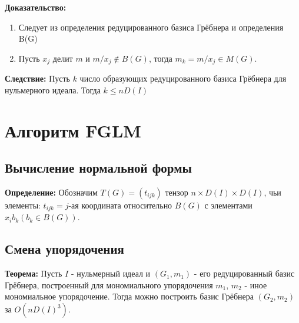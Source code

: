 \documentclass{article}
\begin{document}
    \textbf{Доказательство:}
    \begin{enumerate}
        \item Следует из определения редуцированного базиса Грёбнера и определения B(G)
        \item Пусть $x_j$ делит $m$ и $m/x_j \notin B(G)$, тогда $m_k = m/x_j \in M(G)$. 
    \end{enumerate}

    \textbf{Следствие:} Пусть $k$ число образующих редуцированного базиса Грёбнера для нульмерного идеала.
        Тогда $k \leq nD(I)$
    
    \newpage    

\section{Алгоритм FGLM}

    \subsection{Вычисление нормальной формы}
    \textbf{Определение:}  Обозначим $T(G) = (t_{ijk})$ тензор $n \times D(I) \times D(I)$, чьи элементы:
            $t_{ijk}=j$-ая координата относительно $B(G)$ с элементами $x_ib_k (b_k \in B(G))$.
    
    \newpage
    \subsection{Смена упорядочения}
    \textbf{Теорема:} Пусть $I$ - нульмерный идеал и $(G_1, m_1)$ - его редуцированный 
    базис Грёбнера, построенный для мономиального упорядочения $m_1$, $m_2$ - иное мономиальное упорядочение. Тогда можно построить
    базис Грёбнера $(G_2, m_2)$ за $O(nD(I)^3)$.
    
\end{document}
